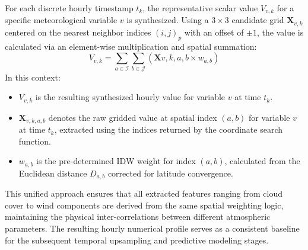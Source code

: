 \documentclass[conference]{IEEEtran}
\begin{document}
\begin{itemize}
		For each discrete hourly timestamp $t_k$, the representative scalar value $V_{v,k}$ for a specific meteorological variable $v$ is synthesized. Using a $3 \times 3$ candidate grid $\mathbf{X}_{v,k}$ centered on the nearest neighbor indices $(i, j)_p$ with an offset of $\pm 1$, the value is calculated via an element-wise multiplication and spatial summation:
		\begin{equation*} 
			V_{v,k} = \sum_{a \in \mathcal{I}} \sum_{b \in \mathcal{J}} (\mathbf{X}{v, k, a, b} \times w_{a,b}) 
		\end{equation*}
		In this context:
		\begin{itemize}
			\item $V_{v,k}$ is the resulting synthesized hourly value for variable $v$ at time $t_k$.
			\item $\mathbf{X}_{v,k,a,b}$ denotes the raw gridded value at spatial index $(a, b)$ for variable $v$ at time $t_k$, extracted using the indices returned by the coordinate search function.
			\item $w_{a,b}$ is the pre-determined IDW weight for index $(a, b)$, calculated from the Euclidean distance $D_{a,b}$ corrected for latitude convergence.
		\end{itemize}
		This unified approach ensures that all extracted features ranging from cloud cover to wind components are derived from the same spatial weighting logic, maintaining the physical inter-correlations between different atmospheric parameters. The resulting hourly numerical profile serves as a consistent baseline for the subsequent temporal upsampling and predictive modeling stages.
		

\end{itemize}
\end{document}
